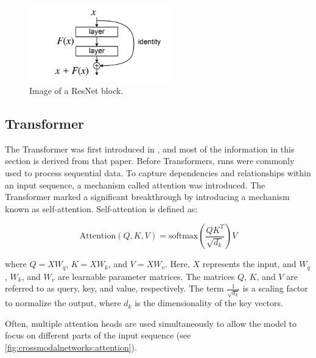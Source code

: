     \begin{figure}[h]
        \centering
        \includegraphics[width=0.55\textwidth]{Images/crossmodalnetworks/ResBlock.png}
        \caption{Image of a ResNet block.\cite{resnetpaper}}
        \label{fig:crossmodalnetworks:resblock}
    \end{figure}

    \subsection{Transformer}

    The Transformer was first introduced in \cite{attentionisallyouneed}, and most of the information in this section is derived from that paper. 
    Before Transformers, \acrfull{rnn}s were commonly used to process sequential data. 
    To capture dependencies and relationships within an input sequence, a mechanism called attention was introduced. 
    The Transformer marked a significant breakthrough by introducing a mechanism known as self-attention. 
    Self-attention is defined as:

    \begin{equation}
        \text{Attention}(Q, K, V) = \text{softmax}\left(\frac{QK^T}{\sqrt{d_k}}\right)V
        \label{equ:selfattention}
    \end{equation}

    where \(Q = XW_q\), \(K = XW_k\), and \(V = XW_v\). 
    Here, \(X\) represents the input, and \(W_{q}\), \(W_{k}\), and \(W_{v}\) are learnable parameter matrices. 
    The matrices \(Q\), \(K\), and \(V\) are referred to as query, key, and value, respectively. 
    The term \(\frac{1}{\sqrt{d_k}}\) is a scaling factor to normalize the output, where \(d_k\) is the dimensionality of the key vectors.
    
    Often, multiple attention heads are used simultaneously to allow the model to focus on different parts of the input sequence (see \cref{fig:crossmodalnetworks:attention}).
    
